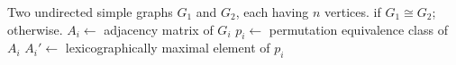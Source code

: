 
\begin{algorithmic}[1]
\Require Two undirected simple graphs $G_1$ and $G_2$, each having $n$
  vertices.
\Ensure \MyTrue if $G_1 \cong G_2$; \MyFalse otherwise.
  \State $A_i \gets$ adjacency matrix of $G_i$
  \State $p_i \gets$ permutation equivalence class of $A_i$
  \State $A_i' \gets$ lexicographically maximal element of $p_i$
\EndFor
{}
  \State \Return \MyTrue
\EndIf
\State \Return \MyFalse
\end{algorithmic}
